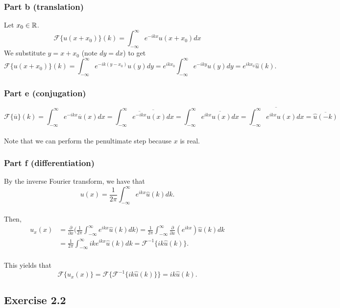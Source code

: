 \documentclass{article}
\begin{document}
\subsubsection{Part b (translation)}
Let $x_0\in\mathbb{R}$. \\
\[
\mathcal{F}\{u(x+x_0)\}(k)=\int_{-\infty}^\infty e^{-ikx}u(x+x_0)dx
\]
We substitute $y=x+x_0$ (note $dy=dx$) to get 
\[
\mathcal{F}\{u(x+x_0)\}(k)=\int_{-\infty}^\infty e^{-ik(y-x_0)}u(y)dy=e^{ikx_0}\int_{-\infty}^\infty e^{-iky}u(y)dy=e^{ikx_0}\hat{u}(k).
\]
\subsubsection{Part e (conjugation)}
\[
\mathcal{F}\{\overline{u}\}(k)=\int_{-\infty}^\infty e^{-ikx}\overline{u}(x)dx = \int_{-\infty}^\infty \overline{\overline{e^{-ikx}}u(x)dx}= \int_{-\infty}^\infty \overline{e^{ikx}u(x)dx} = \overline{\int_{-\infty}^\infty e^{ikx}u(x)dx} = \overline{\hat{u}(-k)}
\]\\
Note that we can perform the penultimate step because $x$ is real. 
\subsubsection{Part f (differentiation)}
By the inverse Fourier transform, we have that 
\[
u(x)=\frac{1}{2\pi}\int_{-\infty}^\infty e^{ikx}\hat{u}(k)dk.
\]\\
Then, 
\[
\begin{split}
u_x(x)&=\frac{\partial }{\partial x}\bigg(\frac{1}{2\pi}\int_{-\infty}^\infty e^{ikx}\hat{u}(k)dk\bigg)=\frac{1}{2\pi}\int_{-\infty}^\infty \frac{\partial }{\partial x}(e^{ikx})\hat{u}(k)dk\\&=\frac{1}{2\pi}\int_{-\infty}^\infty ike^{ikx}\hat{u}(k)dk=\mathcal{F}^{-1}\{ik\hat{u}(k)\}.
\end{split}
\]\\
This yields that 
\[
\mathcal{F}\{u_x(x)\}=\mathcal{F}\{\mathcal{F}^{-1}\{ik\hat{u}(k)\}\}=ik\hat{u}(k).
\]
\subsection{Exercise 2.2}
\end{document}
